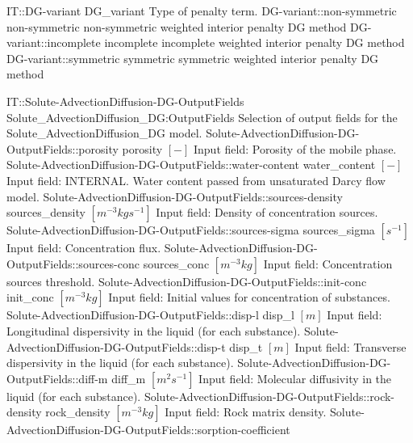 \begin{SelectionType}
	{IT::DG-variant}
	{DG{\_}variant}
	{{{Type of penalty term.}%
}}
		\SelectionItem
			{DG-variant::non-symmetric}
			{non-symmetric}
			{{{non-symmetric weighted interior penalty DG method}%
}}
		\SelectionItem
			{DG-variant::incomplete}
			{incomplete}
			{{{incomplete weighted interior penalty DG method}%
}}
		\SelectionItem
			{DG-variant::symmetric}
			{symmetric}
			{{{symmetric weighted interior penalty DG method}%
}}
\end{SelectionType}
\begin{SelectionType}
	{IT::Solute-AdvectionDiffusion-DG-OutputFields}
	{Solute{\_}AdvectionDiffusion{\_}DG:OutputFields}
	{{{Selection of output fields for the Solute{\_}AdvectionDiffusion{\_}DG model.}%
}}
		\SelectionItem
			{Solute-AdvectionDiffusion-DG-OutputFields::porosity}
			{porosity}
			{{{}{$[-]$}{ Input field: Porosity of the mobile phase.}%
}}
		\SelectionItem
			{Solute-AdvectionDiffusion-DG-OutputFields::water-content}
			{water{\_}content}
			{{{}{$[-]$}{ Input field: INTERNAL. Water content passed from unsaturated Darcy flow model.}%
}}
		\SelectionItem
			{Solute-AdvectionDiffusion-DG-OutputFields::sources-density}
			{sources{\_}density}
			{{{}{$[m^{-3}kgs^{-1}]$}{ Input field: Density of concentration sources.}%
}}
		\SelectionItem
			{Solute-AdvectionDiffusion-DG-OutputFields::sources-sigma}
			{sources{\_}sigma}
			{{{}{$[s^{-1}]$}{ Input field: Concentration flux.}%
}}
		\SelectionItem
			{Solute-AdvectionDiffusion-DG-OutputFields::sources-conc}
			{sources{\_}conc}
			{{{}{$[m^{-3}kg]$}{ Input field: Concentration sources threshold.}%
}}
		\SelectionItem
			{Solute-AdvectionDiffusion-DG-OutputFields::init-conc}
			{init{\_}conc}
			{{{}{$[m^{-3}kg]$}{ Input field: Initial values for concentration of substances.}%
}}
		\SelectionItem
			{Solute-AdvectionDiffusion-DG-OutputFields::disp-l}
			{disp{\_}l}
			{{{}{$[m]$}{ Input field: Longitudinal dispersivity in the liquid (for each substance).}%
}}
		\SelectionItem
			{Solute-AdvectionDiffusion-DG-OutputFields::disp-t}
			{disp{\_}t}
			{{{}{$[m]$}{ Input field: Transverse dispersivity in the liquid (for each substance).}%
}}
		\SelectionItem
			{Solute-AdvectionDiffusion-DG-OutputFields::diff-m}
			{diff{\_}m}
			{{{}{$[m^{2}s^{-1}]$}{ Input field: Molecular diffusivity in the liquid (for each substance).}%
}}
		\SelectionItem
			{Solute-AdvectionDiffusion-DG-OutputFields::rock-density}
			{rock{\_}density}
			{{{}{$[m^{-3}kg]$}{ Input field: Rock matrix density.}%
}}
		\SelectionItem
			{Solute-AdvectionDiffusion-DG-OutputFields::sorption-coefficient}

\end{SelectionType}
